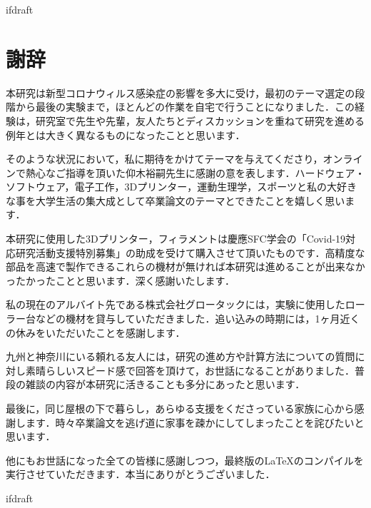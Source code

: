 \expandafter\ifx\csname ifdraft\endcsname\relax
 
\fi

\section*{謝辞}

本研究は新型コロナウィルス感染症の影響を多大に受け，最初のテーマ選定の段階から最後の実験まで，ほとんどの作業を自宅で行うことになりました．この経験は，研究室で先生や先輩，友人たちとディスカッションを重ねて研究を進める例年とは大きく異なるものになったことと思います．

そのような状況において，私に期待をかけてテーマを与えてくださり，オンラインで熱心なご指導を頂いた仰木裕嗣先生に感謝の意を表します．ハードウェア・ソフトウェア，電子工作，3Dプリンター，運動生理学，スポーツと私の大好きな事を大学生活の集大成として卒業論文のテーマとできたことを嬉しく思います．

本研究に使用した3Dプリンター，フィラメントは慶應SFC学会の「Covid-19対応研究活動支援特別募集」の助成を受けて購入させて頂いたものです．高精度な部品を高速で製作できるこれらの機材が無ければ本研究は進めることが出来なかったかったことと思います．深く感謝いたします．

私の現在のアルバイト先である株式会社グロータックには，実験に使用したローラー台などの機材を貸与していただきました．追い込みの時期には，1ヶ月近くの休みをいただいたことを感謝します．

九州と神奈川にいる頼れる友人には，研究の進め方や計算方法についての質問に対し素晴らしいスピード感で回答を頂けて，お世話になることがありました．普段の雑談の内容が本研究に活きることも多分にあったと思います．

最後に，同じ屋根の下で暮らし，あらゆる支援をくださっている家族に心から感謝します．時々卒業論文を逃げ道に家事を疎かにしてしまったことを詫びたいと思います．

他にもお世話になった全ての皆様に感謝しつつ，最終版のLaTeXのコンパイルを実行させていただきます．本当にありがとうございました．

\expandafter\ifx\csname ifdraft\endcsname\relax
  
\fi
